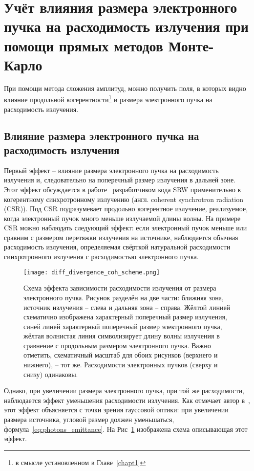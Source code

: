 \section{Учёт влияния размера электронного пучка на расходимость излучения при помощи прямых методов Монте-Карло}
При помощи метода сложения амплитуд, можно получить поля, в которых видно влияние продольной когерентности\footnote{в смысле установленном в Главе~\ref{chapt1}} и размера электронного пучка на расходимость излучения.
\subsection{Влияние размера электронного пучка на расходимость излучения}
Первый эффект -- влияние размера электронного пучка на расходимость излучения и, следовательно на поперечный размер излучения в дальней зоне. Этот эффект обсуждается в работе~\cite{chubar_simulation_2006} разработчиком кода SRW применительно к когерентному синхротронному излучению (англ. coherent synchrotron radiation (CSR)). Под CSR подразумевает продольно когерентное излучение, реализуемое, когда электронный пучок много меньше излучаемой длины волны. На примере CSR можно наблюдать следующий эффект: если электронный пучок меньше или сравним с размером перетяжки излучения на источнике, наблюдается обычная расходимость излучения, определяемая свёрткой натуральной расходимости синхротронного излучения с расходимостью электронного пучка.
\begin{figure}[H]
	\centering 	\texttt{[image: diff\_divergence\_coh\_scheme.png]}
	\caption{Схема эффекта зависимости расходимости излучения от размера электронного пучка. Рисунок разделён на две части: ближняя зона, источник излучения -- слева и дальняя зона -- справа. Жёлтой линией схематично изображена характерный поперечный размер излучения, синей линей характерный поперечный размер электронного пучка, жёлтая волнистая линия символизирует длину волны излучения в сравнение с продольным размером электронного пучка. Важно отметить, схематичный масштаб для обоих рисунков (верхнего и нижнего), -- тот же. Расходимости электронных пучков (сверху и снизу) одинаковы.}
	\label{fig:diff_divergence_coh_scheme}
\end{figure}
Однако, при увеличении размера электронного пучка, при той же расходимости, наблюдается эффект уменьшения расходимости излучения. Как отмечает автор в~\cite{chubar_simulation_2006}, этот эффект объясняется с точки зрения гауссовой оптики: при увеличении размера источника, угловой размер должен уменьшаться, формула~\ref{eq:photons_emittance}. На Рис~\ref{fig:diff_divergence_coh_scheme} изображена схема описывающая этот эффект.

